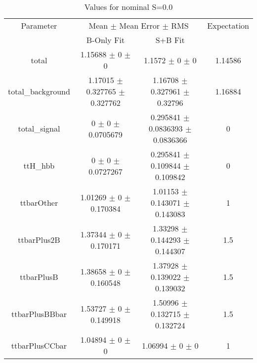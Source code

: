 \begin{table}
\centering
\caption{Values for nominal S=0.0}
\begin{tabular}{cccc}
\toprule
Parameter & \multicolumn{2}{c}{Mean $\pm$ Mean Error $\pm$ RMS} & Expectation\\
 & B-Only Fit & S+B Fit & \\
\midrule
total & \num{1.15688} $\pm$ \num{0} $\pm$ \num{0} & \num{1.1572} $\pm$ \num{0} $\pm$ \num{0} & \num{1.14586}\\
total\_background & \num{1.17015} $\pm$ \num{0.327765} $\pm$ \num{0.327762} & \num{1.16708} $\pm$ \num{0.327961} $\pm$ \num{0.32796} & \num{1.16884}\\
total\_signal & \num{0} $\pm$ \num{0} $\pm$ \num{0.0705679} & \num{0.295841} $\pm$ \num{0.0836393} $\pm$ \num{0.0836366} & \num{0}\\
ttH\_hbb & \num{0} $\pm$ \num{0} $\pm$ \num{0.0727267} & \num{0.295841} $\pm$ \num{0.109844} $\pm$ \num{0.109842} & \num{0}\\
ttbarOther & \num{1.01269} $\pm$ \num{0} $\pm$ \num{0.170384} & \num{1.01153} $\pm$ \num{0.143071} $\pm$ \num{0.143083} & \num{1}\\
ttbarPlus2B & \num{1.37344} $\pm$ \num{0} $\pm$ \num{0.170171} & \num{1.33298} $\pm$ \num{0.144293} $\pm$ \num{0.144307} & \num{1.5}\\
ttbarPlusB & \num{1.38658} $\pm$ \num{0} $\pm$ \num{0.160548} & \num{1.37928} $\pm$ \num{0.139022} $\pm$ \num{0.139032} & \num{1.5}\\
ttbarPlusBBbar & \num{1.53727} $\pm$ \num{0} $\pm$ \num{0.149918} & \num{1.50996} $\pm$ \num{0.132715} $\pm$ \num{0.132724} & \num{1.5}\\
ttbarPlusCCbar & \num{1.04894} $\pm$ \num{0} $\pm$ \num{0} & \num{1.06994} $\pm$ \num{0} $\pm$ \num{0} & \num{1}\\
\bottomrule
\end{tabular}
\end{table}